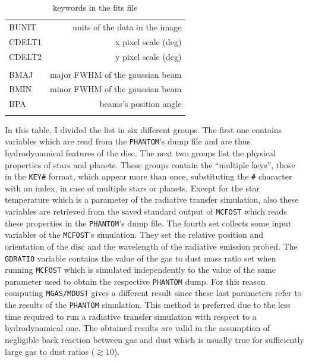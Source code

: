 \documentclass[a4paper,10pt]{report}
\begin{document}
\begin{table}
\begin{center}
\begin{tabular}{l r}
        BUNIT & units of the data in the image \\ 
        CDELT1 & x pixel scale (deg) \\
        CDELT2 & y pixel scale (deg)\\ \\
        
        BMAJ & major FWHM of the gaussian beam \\
        BMIN & minor FWHM of the gaussian beam\\
        BPA & beams's position angle \\ \\
        

         \bottomrule
        \end{tabular}
        \end{center}

        \caption{keywords in the fits file}
\end{table}

In this table, I divided the list in six different groups. The first one contains
variables which are read from the \lstinline{PHANTOM}'s dump file and are thus hydrodynamical features of
the disc. The next two groups list the physical properties of stars and planets. These groups contain the 
``multiple keys'', those in the \lstinline{KEY#} format, which appear more than once, substituting the \lstinline{#} character with an index,
in case of multiple stars or planets.
Except for the star temperature which is a parameter of the radiative transfer simulation, also these variables are retrieved from
the saved standard output of \lstinline{MCFOST} which reads these properties in the \lstinline{PHANTOM}'s dump file.
The fourth set collects some input variables of the \lstinline{MCFOST}'s simulation.
They set the relative position and orientation of the disc and the wavelength of the radiative emission probed.
The \lstinline{GDRATIO} variable contains the value of the gas to dust mass ratio set when running \lstinline{MCFOST}
which is simulated
independently to the value of the same parameter used to obtain the respective \lstinline{PHANTOM} dump. For
this reason computing \lstinline{MGAS/MDUST} gives a different result since these last parameters refer to the results 
of the \lstinline{PHANTOM} simulation.
This method is preferred due to the less time required to run a radiative transfer simulation with respect to a
hydrodynamical one. The obtained results are valid in the assumption of negligible back reaction between gas and dust which
is usually true for sufficiently large gas to dust ratios ($\gtrsim 10$).
\end{document}

